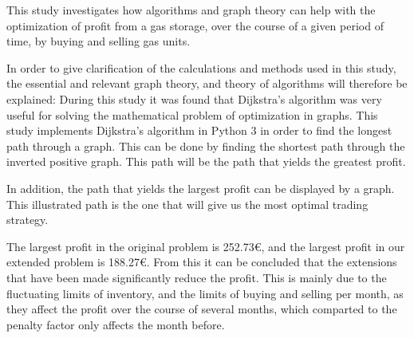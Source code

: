 

This study investigates how algorithms and graph theory can help with the optimization of profit from a gas storage, over the course of a given period of time, by buying and selling gas units. 

In order to give clarification of the calculations and methods used in this study, the essential and relevant graph theory, and theory of algorithms will therefore be explained:  
During this study it was found that Dijkstra's algorithm was very useful for solving the mathematical problem of optimization in graphs. This study implements Dijkstra's algorithm in Python 3 in order to find the longest path through a graph. This can be done by finding the shortest path through the inverted positive graph. This path will be the path that yields the greatest profit. 

In addition, the path that yields the largest profit can be displayed by a graph. This illustrated path is the one that will give us the most optimal trading strategy.

The largest profit in the original problem is 252.73€, and the largest profit in our extended problem is 188.27€. From this it can be concluded that the extensions that have been made significantly reduce the profit. This is mainly due to the fluctuating limits of inventory, and the limits of buying and selling per month, as they affect the profit over the course of several months, which comparted to the penalty factor only affects the month before.
